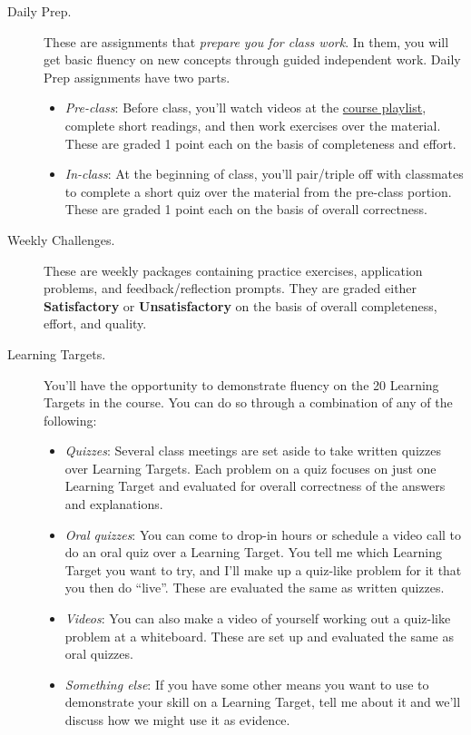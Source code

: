 \documentclass[]{article}
\providecommand{\tightlist}{%
  \setlength{\itemsep}{0pt}\setlength{\parskip}{0pt}}
\begin{document}
\begin{description}
\item[Daily Prep.] These are assignments that \textit{prepare you for class work}. In them, you will get basic fluency on new concepts through guided independent work. Daily Prep assignments have two parts.
    \begin{itemize}
    \tightlist
        \item \textit{Pre-class}: Before class, you'll watch videos at the \href{https://vimeo.com/showcase/8667148}{course  playlist}, complete short readings, and then work  exercises over the material. These are graded 1 point each on the basis of completeness and effort. 
        \item \textit{In-class}: At the beginning of class, you'll pair/triple off with classmates to complete a short quiz over the material from the pre-class portion. These are graded 1 point each on the basis of overall correctness. 
    \end{itemize}
\item[Weekly Challenges.] These are weekly packages containing practice exercises, application problems, and feedback/reflection prompts. They are graded either \textbf{Satisfactory} or \textbf{Unsatisfactory} on the basis of overall completeness, effort, and quality. 
\item[Learning Targets.] You'll have the opportunity to demonstrate fluency on the 20 Learning Targets in the course. You can do so through a combination of any of the following: 
    \begin{itemize}
    \tightlist
        \item \textit{Quizzes}: Several class meetings are set aside to take written quizzes over Learning Targets. Each problem on a quiz focuses on just one Learning Target and evaluated for overall correctness of the answers and explanations.  
        \item \textit{Oral quizzes}: You can come to drop-in hours or schedule a video call to do an oral quiz over a Learning Target. You tell me which Learning Target you want to try, and I'll make up a quiz-like problem for it that you then do ``live''. These are evaluated the same as written quizzes. 
        \item \textit{Videos}: You can also make a video of yourself working out a quiz-like problem at a whiteboard. These are set up and evaluated the same as oral quizzes.
        \item \textit{Something else}: If you have some other means you want to use to demonstrate your skill on a Learning Target, tell me about it and we'll discuss how we might use it as evidence. 

\end{itemize}
\end{description}
\end{document}
